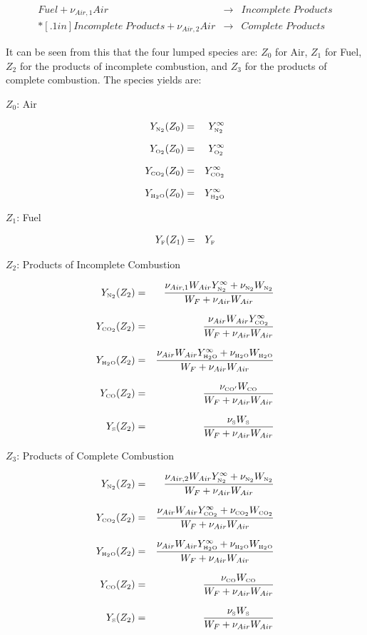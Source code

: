 \begin{eqnarray}
Fuel + \nu_{Air,1} Air &\rightarrow&  Incomplete \; Products\\*[.1in]
Incomplete \; Products + \nu_{Air,2} Air &\rightarrow&  Complete \; Products
\label{4lumped}
\end{eqnarray}

It can be seen from this that the four lumped species are: $Z_0$ for Air, $Z_1$ for Fuel, $Z_2$ for the products of incomplete combustion, and $Z_3$ for the products of complete combustion.  The species yields are:

$Z_0$: Air

\begin{eqnarray}
Y_{{\tiny \hbox{N}_2}}(Z_0) & = & Y_{\tiny \hbox{N}_2}^\infty\\*[.1in]
Y_{{\tiny \hbox{O}_2}}(Z_0) & = & Y_{\tiny \hbox{O}_2}^\infty\\*[.1in]
Y_{{\tiny \hbox{CO}_2}}(Z_0) & = & Y_{\tiny \hbox{CO}_2}^\infty\\*[.1in]
Y_{{\tiny \hbox{H}_2\hbox{O}}}(Z_0) & = & Y_{\tiny \hbox{H}_2\hbox{O}}^\infty
\end{eqnarray}

$Z_1$: Fuel

\begin{eqnarray}
Y_{{\tiny \hbox{F}}}(Z_1) & = & Y_{\tiny \hbox{F}}
\end{eqnarray}

$Z_2$: Products of Incomplete Combustion

\begin{eqnarray}
Y_{{\tiny \hbox{N}_2}}(Z_2) & = & \frac{\nu_{Air,1} W_{Air} Y_{\tiny \hbox{N}_2}^\infty +\nu_{{\tiny \hbox{N}_2}} W_{{\tiny \hbox{N}_2}}}{W_F + \nu_{Air} W_{Air}}\\*[.1in]
Y_{{\tiny \hbox{CO}_2}}(Z_2) & = & \frac{\nu_{Air} W_{Air} Y_{\tiny \hbox{CO}_2}^\infty}{W_F + \nu_{Air} W_{Air}} \\*[.1in]
Y_{{\tiny \hbox{H}_2\hbox{O}}}(Z_2) & = & \frac{\nu_{Air} W_{Air}  Y_{\tiny \hbox{H}_2\hbox{O}}^\infty +\nu_{{\tiny \hbox{H}_2\hbox{O}}} W_{{\tiny \hbox{H}_2\hbox{O}}}}{W_F + \nu_{Air} W_{Air}}\\*[.1in]
Y_{{\tiny \hbox{CO}}}(Z_2) & = & \frac{\nu_{{\tiny \hbox{CO}}'} W_{{\tiny \hbox{CO}}}}{W_F + \nu_{Air} W_{Air}}\\*[.1in]
Y_{{\tiny \hbox{S}}}(Z_2) & = & \frac{\nu_{{\tiny \hbox{S}}} W_{{\tiny \hbox{S}}}}{W_F + \nu_{Air} W_{Air}}
\end{eqnarray}

$Z_3$: Products of Complete Combustion

\begin{eqnarray}
Y_{{\tiny \hbox{N}_2}}(Z_2) & = & \frac{\nu_{Air,2} W_{Air}  Y_{\tiny \hbox{N}_2}^\infty +\nu_{{\tiny \hbox{N}_2}} W_{{\tiny \hbox{N}_2}}}{W_F + \nu_{Air} W_{Air}}\\*[.1in]
Y_{{\tiny \hbox{CO}_2}}(Z_2) & = & \frac{\nu_{Air} W_{Air}  Y_{\tiny \hbox{CO}_2}^\infty +\nu_{{\tiny \hbox{CO}_2}} W_{{\tiny \hbox{CO}_2}}}{W_F + \nu_{Air} W_{Air}}\\*[.1in]
Y_{{\tiny \hbox{H}_2\hbox{O}}}(Z_2) & = & \frac{\nu_{Air} W_{Air}  Y_{\tiny \hbox{H}_2\hbox{O}}^\infty +\nu_{{\tiny \hbox{H}_2\hbox{O}}} W_{{\tiny \hbox{H}_2\hbox{O}}}}{W_F + \nu_{Air} W_{Air}}\\*[.1in]
Y_{{\tiny \hbox{CO}}}(Z_2) & = & \frac{\nu_{\tiny \hbox{CO}} W_{{\tiny \hbox{CO}}}}{W_F + \nu_{Air} W_{Air}}\\*[.1in]
Y_{{\tiny \hbox{S}}}(Z_2) & = & \frac{\nu_{{\tiny \hbox{S}}} W_{{\tiny \hbox{S}}}}{W_F + \nu_{Air} W_{Air}}
\end{eqnarray}



